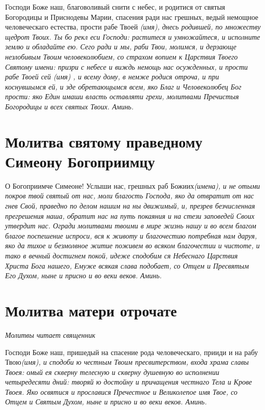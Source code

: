 Господи Боже наш, благоволивый снити с небес, и родитися от святыя Богородицы и Приснодевы Марии, спасения ради нас грешных, ведый немощное человеческаго естества, прости рабе Твоей \itshape (имя)\normalfont{}, днесь родившей, по множеству щедрот Твоих. Ты бо рекл еси Господи: раститеся и умножайтеся, и исполните землю и обладайте ею. Сего ради и мы, раби Твои, молимся, и дерзающе незлобивым Твоим человеколюбием, со страхом вопием к Царствия Твоего Святому имени: призри с небесе и виждь немощь нас осужденных, и прости рабе Твоей сей (\itshape имя\normalfont{}) , и всему дому, в немже родися отроча, и при коснувшымся ей, и зде обретающымся всем, яко Благ и Человеколюбец Бог прости: яко Един имаши власть оставляти грехи, молитвами Пречистыя Богородицы и всех святых Твоих. Аминь.





\section{Молитва святому праведному Симеону Богоприимцу}
 


О Богоприимче Симеоне! Услыши нас, грешных раб Божиих\itshape  (имена),\normalfont{} и не отыми покров твой святый от нас, моли благость Господа, яко да отвратит от нас гнев Свой, праведно по делом нашим на ны движимый, и, презрев безчисленная прегрешения наша, обратит нас на путь покаяния и на стези заповедей Своих утвердит нас. Огради молитвами твоими в мире жизнь нашу и во всем благом благое поспешение испроси, вся к животу и благочестию потребная нам даруя, яко да тихое и безмолвное житие поживем во всяком благочестии и чистоте, и тако в вечный достигнем покой, идеже сподобим ся Небеснаго Царствия Христа Бога нашего, Емуже всякая слава подобает, со Отцем и Пресвятым Его Духом, ныне и присно и во веки веков. Аминь. 


\section{Молитва матери отрочате}
 


\itshape Молитвы читает священник\normalfont{}

Господи Боже наш, пришедый на спасение рода человеческаго, прииди и на рабу Твою\itshape  (имя)\normalfont{}, и сподоби ю честным Твоим пресвитерством, входа храма славы Твоея: омый ея скверну телесную и скверну душевную во исполнении четыредесяти дний: творяй ю достойну и причащения честнаго Тела и Крове Твоея. Яко освятися и прославися Пречестное и Великолепое имя Твое, со Отцем и Святым Духом, ныне и присно и во веки веков. Аминь. 






